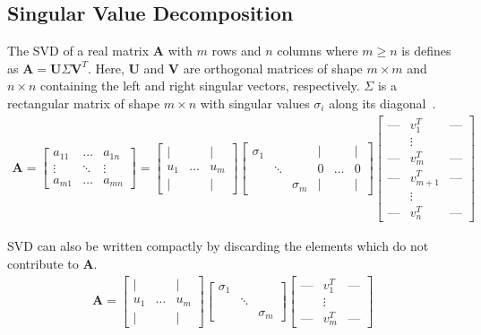 \subsection{Singular Value Decomposition}
The SVD of a real matrix $\mathbf{A}$ with $m$ rows and $n$ columns where $m
\geq n$ is defines as $\mathbf{A} = \mathbf{U}\Sigma\mathbf{V}^T$. Here, $\mathbf{U}$ and
$\mathbf{V}$ are orthogonal matrices of shape $m \times m$ and $n \times n$
containing the left and right singular vectors, respectively. $\Sigma$ is a
rectangular matrix of shape $m \times n$ with singular values $\sigma_i$ along
its diagonal~\cite{Strang2009}.
\begin{align}
\mathbf{A} = \begin{bmatrix} a_{11} & \dots & a_{1n} \\ \vdots & \ddots & \vdots
    \\ a_{m1} & \dots & a_{mn} \end{bmatrix} = \begin{bmatrix} \mid & & \mid \\ u_1 & \ldots & u_m
\\ \mid & & \mid  \end{bmatrix} \begin{bmatrix} \sigma_1 & &  & \mid & & \mid \\ &
\ddots & & 0 & \ldots & 0 \\ & & \sigma_m & \mid & & \mid  \end{bmatrix} \begin{bmatrix}
    \text{---} & v_1^T & \text{---} \\ & \vdots & \\ \text{---} & v_m^T & \text{---} \\
    \text{---} & v_{m+1}^T & \text{---} \\ & \vdots  & \\ \text{---} & v_n^T & \text{---}
\end{bmatrix}
\end{align}

SVD can also be written compactly by discarding the elements which do not
contribute to $\mathbf{A}$.
\begin{align}
\mathbf{A} = \begin{bmatrix} \mid & & \mid \\ u_1 & \ldots & u_m
\\ \mid & & \mid  \end{bmatrix} \begin{bmatrix} \sigma_1 &
        & \\ & \ddots & \\ & & \sigma_m \end{bmatrix} \begin{bmatrix} \text{---}
& v_1^T & \text{---} \\ & \vdots & \\ \text{---} & v_m^T & \text{---}
\end{bmatrix}
\end{align}

